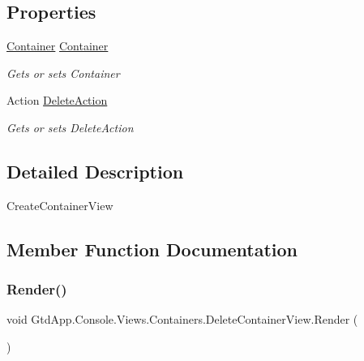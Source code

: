 \subsection*{Properties}
\begin{DoxyCompactItemize}
\item 
\mbox{\hyperlink{class_gtd_app_1_1_data_1_1_container}{Container}} \mbox{\hyperlink{class_gtd_app_1_1_console_1_1_views_1_1_containers_1_1_delete_container_view_a081d48fc824b45b93f12249d54b0ac55}{Container}}
\begin{DoxyCompactList}\small\item\em Gets or sets Container \end{DoxyCompactList}\item 
Action \mbox{\hyperlink{class_gtd_app_1_1_console_1_1_views_1_1_containers_1_1_delete_container_view_a997afdf842b9e28b102f40ec2755ebd9}{Delete\+Action}}
\begin{DoxyCompactList}\small\item\em Gets or sets Delete\+Action \end{DoxyCompactList}\end{DoxyCompactItemize}


\subsection{Detailed Description}
Create\+Container\+View 



\subsection{Member Function Documentation}
\mbox{\label{class_gtd_app_1_1_console_1_1_views_1_1_containers_1_1_delete_container_view_a794e418996670c0ec9a44c21c71e1c09}} 
\subsubsection{\texorpdfstring{Render()}{Render()}}
{\footnotesize\ttfamily void Gtd\+App.\+Console.\+Views.\+Containers.\+Delete\+Container\+View.\+Render (\begin{DoxyParamCaption}{ }\end{DoxyParamCaption})}



